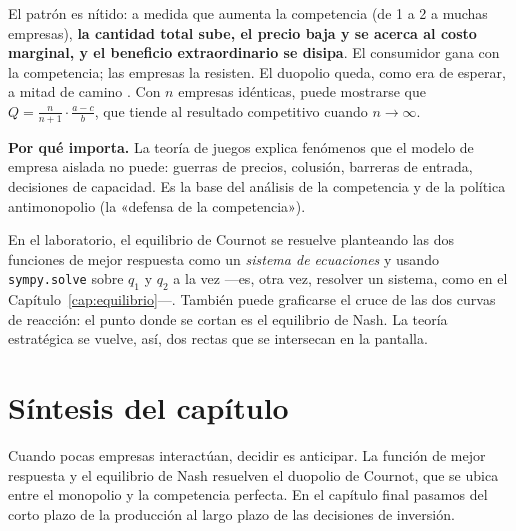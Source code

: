 El patrón es nítido: a medida que aumenta la competencia (de 1 a 2 a muchas empresas), \textbf{la cantidad total sube, el precio baja y se acerca al costo marginal, y el beneficio extraordinario se disipa}. El consumidor gana con la competencia; las empresas la resisten. El duopolio queda, como era de esperar, a mitad de camino \cite{pindyck}. Con $n$ empresas idénticas, puede mostrarse que $Q = \tfrac{n}{n+1}\cdot\tfrac{a-c}{b}$, que tiende al resultado competitivo cuando $n\to\infty$.

\begin{ideabox}
\textbf{Por qué importa.} La teoría de juegos explica fenómenos que el modelo de empresa aislada no puede: guerras de precios, colusión, barreras de entrada, decisiones de capacidad. Es la base del análisis de la competencia y de la política antimonopolio (la «defensa de la competencia»).
\end{ideabox}

\begin{labbox}
En el laboratorio, el equilibrio de Cournot se resuelve planteando las dos funciones de mejor respuesta como un \emph{sistema de ecuaciones} y usando \texttt{sympy.solve} sobre $q_1$ y $q_2$ a la vez —es, otra vez, resolver un sistema, como en el Capítulo~\ref{cap:equilibrio}—. También puede graficarse el cruce de las dos curvas de reacción: el punto donde se cortan es el equilibrio de Nash. La teoría estratégica se vuelve, así, dos rectas que se intersecan en la pantalla.
\end{labbox}

\section{Síntesis del capítulo}

Cuando pocas empresas interactúan, decidir es anticipar. La función de mejor respuesta y el equilibrio de Nash resuelven el duopolio de Cournot, que se ubica entre el monopolio y la competencia perfecta. En el capítulo final pasamos del corto plazo de la producción al largo plazo de las decisiones de inversión.
